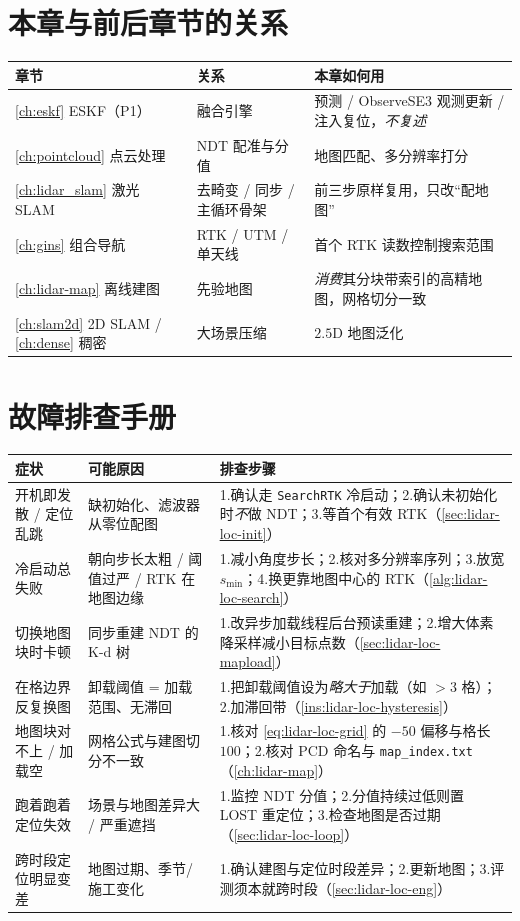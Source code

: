 \section*{本章与前后章节的关系}
\begin{table}[H]\centering\small
\begin{tabular}{lll}
\toprule
章节 & 关系 & 本章如何用 \\
\midrule
\cref{ch:eskf} ESKF（P1） & 融合引擎 & 预测 / ObserveSE3 观测更新 / 注入复位，\emph{不复述} \\
\cref{ch:pointcloud} 点云处理 & NDT 配准与分值 & 地图匹配、多分辨率打分 \\
\cref{ch:lidar_slam} 激光 SLAM & 去畸变 / 同步 / 主循环骨架 & 前三步原样复用，只改“配地图” \\
\cref{ch:gins} 组合导航 & RTK / UTM / 单天线 & 首个 RTK 读数控制搜索范围 \\
\cref{ch:lidar-map} 离线建图 & 先验地图 & \emph{消费}其分块带索引的高精地图，网格切分一致 \\
\cref{ch:slam2d} 2D SLAM / \cref{ch:dense} 稠密 & 大场景压缩 & $2.5$D 地图泛化 \\
\bottomrule
\end{tabular}
\end{table}

\section*{故障排查手册}
\begin{table}[H]\centering\small
\begin{tabular}{p{} p{} p{}}
\toprule
症状 & 可能原因 & 排查步骤 \\
\midrule
开机即发散 / 定位乱跳 & 缺初始化、滤波器从零位配图 & 1.确认走 \texttt{SearchRTK} 冷启动；2.确认未初始化时\emph{不}做 NDT；3.等首个有效 RTK（\cref{sec:lidar-loc-init}）\\
冷启动总失败 & 朝向步长太粗 / 阈值过严 / RTK 在地图边缘 & 1.减小角度步长；2.核对多分辨率序列；3.放宽 $s_{\min}$；4.换更靠地图中心的 RTK（\cref{alg:lidar-loc-search}）\\
切换地图块时卡顿 & 同步重建 NDT 的 K-d 树 & 1.改异步加载线程后台预读重建；2.增大体素降采样减小目标点数（\cref{sec:lidar-loc-mapload}）\\
在格边界反复换图 & 卸载阈值 = 加载范围、无滞回 & 1.把卸载阈值设为\emph{略大于}加载（如 $>3$ 格）；2.加滞回带（\cref{ins:lidar-loc-hysteresis}）\\
地图块对不上 / 加载空 & 网格公式与建图切分不一致 & 1.核对 \cref{eq:lidar-loc-grid} 的 $-50$ 偏移与格长 $100$；2.核对 PCD 命名与 \texttt{map\_index.\allowbreak txt}（\cref{ch:lidar-map}）\\
跑着跑着定位失效 & 场景与地图差异大 / 严重遮挡 & 1.监控 NDT 分值；2.分值持续过低则置 \textsf{LOST} 重定位；3.检查地图是否过期（\cref{sec:lidar-loc-loop}）\\
跨时段定位明显变差 & 地图过期、季节/施工变化 & 1.确认建图与定位时段差异；2.更新地图；3.评测须本就跨时段（\cref{sec:lidar-loc-eng}）\\
\bottomrule
\end{tabular}
\end{table}


